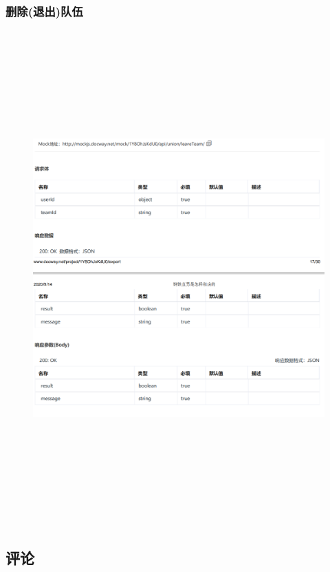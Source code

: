             \subsubsection{删除(退出)队伍}
            \begin{figure}[h]
                \centering
                \includegraphics[height=19.0cm,width=14.0cm]{design/image/api18.png} 
                \end{figure}  
                \newpage    
                
        \subsection{评论}  
